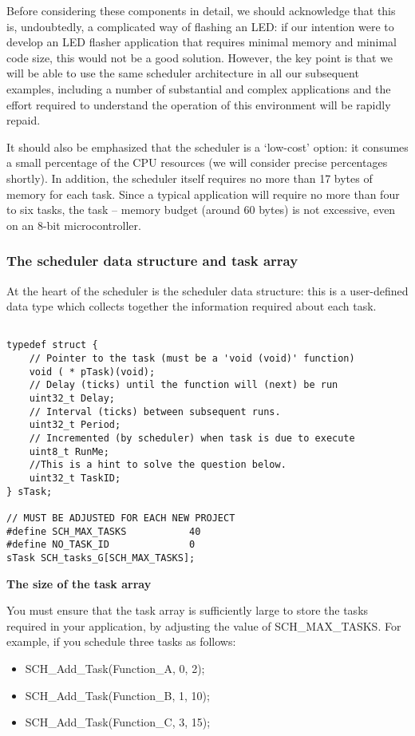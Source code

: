 Before considering these components in detail, we should acknowledge that this is,
undoubtedly, a complicated way of flashing an LED: if our intention were to develop
an LED flasher application that requires minimal memory and minimal code size,
this would not be a good solution. However, the key point is that we will be able to
use the same scheduler architecture in all our subsequent examples, including a
number of substantial and complex applications and the effort required to understand the operation of this environment will be rapidly repaid.

It should also be emphasized that the scheduler is a ‘low-cost’ option: it consumes
a small percentage of the CPU resources (we will consider precise percentages shortly).
In addition, the scheduler itself requires no more than 17 bytes of memory for each
task. Since a typical application will require no more than four to six tasks, the task –
memory budget (around 60 bytes) is not excessive, even on an 8-bit microcontroller.

\subsubsection{The scheduler data structure and task array}
At the heart of the scheduler is the scheduler data structure: this is a user-defined data
type which collects together the information required about each task.

\begin{lstlisting}[basicstyle=\small, caption=A struct of a task]

typedef struct {
    // Pointer to the task (must be a 'void (void)' function)
	void ( * pTask)(void);
	// Delay (ticks) until the function will (next) be run
	uint32_t Delay;
	// Interval (ticks) between subsequent runs.
	uint32_t Period;
	// Incremented (by scheduler) when task is due to execute
	uint8_t RunMe;
	//This is a hint to solve the question below.
	uint32_t TaskID;
} sTask;

// MUST BE ADJUSTED FOR EACH NEW PROJECT
#define SCH_MAX_TASKS 			40
#define	NO_TASK_ID				0
sTask SCH_tasks_G[SCH_MAX_TASKS];
\end{lstlisting}

\textbf{The size of the task array}

You must ensure that the task array is sufficiently large to store the tasks required in
your application, by adjusting the value of SCH\_MAX\_TASKS.
For example, if you schedule three tasks as follows:
\begin{itemize}
    \item SCH\_Add\_Task(Function\_A, 0, 2);
    \item SCH\_Add\_Task(Function\_B, 1, 10);
    \item SCH\_Add\_Task(Function\_C, 3, 15);
\end{itemize}



